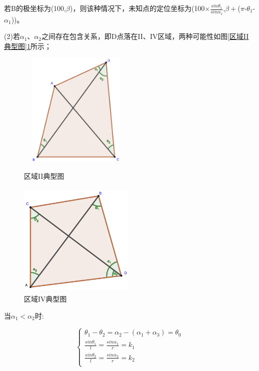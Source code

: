 \documentclass{ctexart}
\begin{document}
若B的极坐标为(100,$\beta$)，则该种情况下，未知点的定位坐标为(100$\times\frac{sin\theta_1}{sin\alpha_1}$,$\beta +$($\pi$-$\theta_1$-$\alpha_1$))。


(2)若$\alpha_1$、$\alpha_2$之间存在包含关系，即D点落在II、IV区域，两种可能性如图\ref{区域II典型图}\ref{区域IV典型图}所示；

\begin{figure}[H]
  \begin{minipage}[t]{0.45\linewidth}
  \centering
  \includegraphics[height=5.5cm,width=5.5cm]{pic/case4.eps}
  \caption{区域II典型图}
  \label{区域II典型图}
  \end{minipage}%
  \begin{minipage}[t]{0.45\linewidth}
  \centering
  \includegraphics[height=5.5cm,width=5.5cm]{pic/case2+.eps}
  \caption{区域IV典型图}
  \label{区域IV典型图}
  \end{minipage}
  \end{figure}


当$\alpha_1 < \alpha_2$时:

\begin{equation}
    \left\{
              \begin{array}{ll}
                \theta_1-\theta_2=\alpha_2-(\alpha_1+\alpha_3)=\theta_0\\
                \frac{sin\theta_1}{l}=\frac{sin\alpha_1}{r}=k_1\\
                \frac{sin\theta_2}{l}=\frac{sin\alpha_2}{r}=k_2\\

              \end{array}
            \right.
\end{equation}
\end{document}
